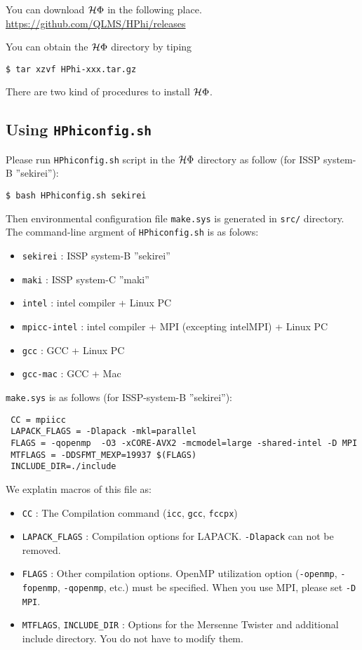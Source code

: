 You can download $\mathcal{H} \Phi$ in the following place.\\
\url{https://github.com/QLMS/HPhi/releases}

You can obtain the $\mathcal{H} \Phi$ directory by tiping
\begin{verbatim}
$ tar xzvf HPhi-xxx.tar.gz
\end{verbatim}

There are two kind of procedures to install $\mathcal{H} \Phi$.

\subsection{Using \texttt{HPhiconfig.sh}}

Please run \verb|HPhiconfig.sh| script in the $\mathcal{H} \Phi$ directory as follow
(for ISSP system-B ''sekirei''):
\begin{verbatim}
$ bash HPhiconfig.sh sekirei
\end{verbatim}
Then environmental configuration file \verb|make.sys| is generated in 
\verb|src/| directory.
The command-line argment of \verb|HPhiconfig.sh| is as folows:
\begin{itemize}
\item \verb|sekirei| : ISSP system-B ''sekirei''
\item \verb|maki| : ISSP system-C ''maki''
\item \verb|intel| : intel compiler + Linux PC
\item \verb|mpicc-intel| : intel compiler + MPI (excepting intelMPI) + Linux PC
\item \verb|gcc| : GCC + Linux PC
\item \verb|gcc-mac| : GCC + Mac
\end{itemize}

\verb|make.sys| is as follows (for ISSP-system-B ''sekirei''):
\begin{verbatim}
 CC = mpiicc
 LAPACK_FLAGS = -Dlapack -mkl=parallel 
 FLAGS = -qopenmp  -O3 -xCORE-AVX2 -mcmodel=large -shared-intel -D MPI
 MTFLAGS = -DDSFMT_MEXP=19937 $(FLAGS)
 INCLUDE_DIR=./include
\end{verbatim}
We explatin macros of this file as: 
\begin{itemize}
\item \verb|CC| : The Compilation command (\verb|icc|, \verb|gcc|, \verb|fccpx|)
\item \verb|LAPACK_FLAGS| : Compilation options for LAPACK. \verb|-Dlapack| can not be removed.
\item \verb|FLAGS| : Other compilation options.
  OpenMP utilization option (\verb|-openmp|, \verb|-fopenmp|, \verb|-qopenmp|, etc.)
  must be specified.
  When you use MPI, please set \verb|-D MPI|.
\item \verb|MTFLAGS|, \verb|INCLUDE_DIR| : Options for the Mersenne Twister
  and additional include directory. You do not have to modify them.
\end{itemize}


